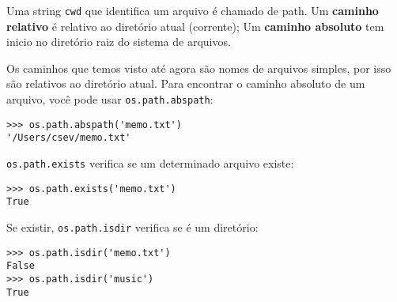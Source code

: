 Uma string {\tt cwd} que identifica um arquivo é chamado de path.
Um {\bf caminho relativo} é relativo ao diretório atual (corrente);
Um {\bf caminho absoluto} tem inicio no diretório raiz do sistema de arquivos.


Os caminhos que temos visto até agora são nomes de arquivos simples, por isso são relativos ao diretório atual. Para encontrar o caminho absoluto de um arquivo, você pode usar {\tt os.path.abspath}:

\beforeverb
\begin{verbatim}
>>> os.path.abspath('memo.txt')
'/Users/csev/memo.txt'
\end{verbatim}
\afterverb

{\tt os.path.exists} verifica se um determinado arquivo existe:


\beforeverb
\begin{verbatim}
>>> os.path.exists('memo.txt')
True
\end{verbatim}
\afterverb

Se existir, {\tt os.path.isdir} verifica se é um diretório:

\beforeverb
\begin{verbatim}
>>> os.path.isdir('memo.txt')
False
>>> os.path.isdir('music')
True
\end{verbatim}
\afterverb


